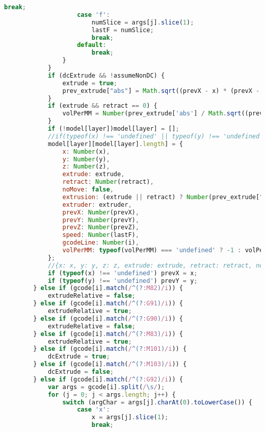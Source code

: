 \begin{lstlisting}[language=JavaScript, label={lst:Worker}, caption=Workerjs is the core gcode to D3 line processor.]
                        break;
                    case 'f':
                        numSlice = args[j].slice(1);
                        lastF = numSlice;
                        break;
                    default:
                        break;
                }
            }
            if (dcExtrude && !assumeNonDC) {
                extrude = true;
                prev_extrude["abs"] = Math.sqrt((prevX - x) * (prevX - x) + (prevY - y) * (prevY - y));
            }
            if (extrude && retract == 0) {
                volPerMM = Number(prev_extrude['abs'] / Math.sqrt((prevX - x) * (prevX - x) + (prevY - y) * (prevY - y)));
            }
            if (!model[layer])model[layer] = [];
            //if(typeof(x) !== 'undefined' || typeof(y) !== 'undefined' ||typeof(z) !== 'undefined'||retract!=0)
            model[layer][model[layer].length] = {
                x: Number(x),
                y: Number(y),
                z: Number(z),
                extrude: extrude,
                retract: Number(retract),
                noMove: false,
                extrusion: (extrude || retract) ? Number(prev_extrude["abs"]) : 0,
                extruder: extruder,
                prevX: Number(prevX),
                prevY: Number(prevY),
                prevZ: Number(prevZ),
                speed: Number(lastF),
                gcodeLine: Number(i),
                volPerMM: typeof(volPerMM) === 'undefined' ? -1 : volPerMM
            };
            //{x: x, y: y, z: z, extrude: extrude, retract: retract, noMove: false, extrusion: (extrude||retract)?prev_extrude["abs"]:0, prevX: prevX, prevY: prevY, prevZ: prevZ, speed: lastF, gcodeLine: i};
            if (typeof(x) !== 'undefined') prevX = x;
            if (typeof(y) !== 'undefined') prevY = y;
        } else if (gcode[i].match(/^(?:M82)/i)) {
            extrudeRelative = false;
        } else if (gcode[i].match(/^(?:G91)/i)) {
            extrudeRelative = true;
        } else if (gcode[i].match(/^(?:G90)/i)) {
            extrudeRelative = false;
        } else if (gcode[i].match(/^(?:M83)/i)) {
            extrudeRelative = true;
        } else if (gcode[i].match(/^(?:M101)/i)) {
            dcExtrude = true;
        } else if (gcode[i].match(/^(?:M103)/i)) {
            dcExtrude = false;
        } else if (gcode[i].match(/^(?:G92)/i)) {
            var args = gcode[i].split(/\s/);
            for (j = 0; j < args.length; j++) {
                switch (argChar = args[j].charAt(0).toLowerCase()) {
                    case 'x':
                        x = args[j].slice(1);
                        break;

\end{lstlisting}
